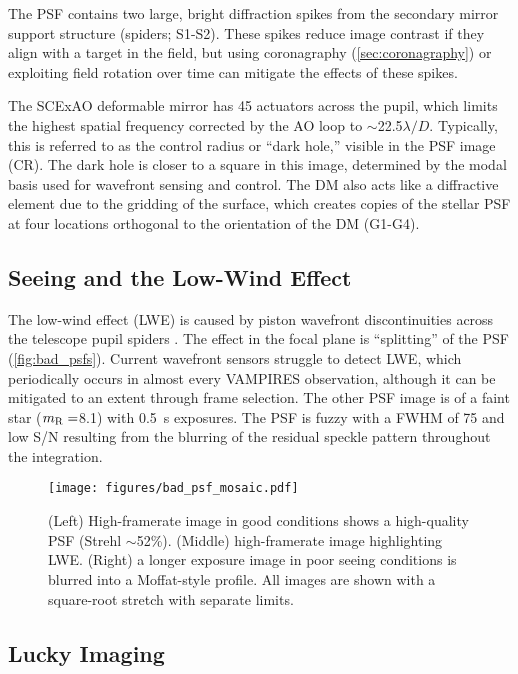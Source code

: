 The PSF contains two large, bright diffraction spikes from the secondary mirror support structure (spiders; S1-S2). These spikes reduce image contrast if they align with a target in the field, but using coronagraphy (\autoref{sec:coronagraphy}) or exploiting field rotation over time can mitigate the effects of these spikes.

The SCExAO deformable mirror has 45 actuators across the pupil, which limits the highest spatial frequency corrected by the AO loop to $\sim$22.5$\lambda/D$. Typically, this is referred to as the control radius or ``dark hole,'' visible in the PSF image (CR). The dark hole is closer to a square in this image, determined by the modal basis used for wavefront sensing and control. The DM also acts like a diffractive element due to the gridding of the surface, which creates copies of the stellar PSF at four locations orthogonal to the orientation of the DM (G1-G4).

\subsection{Seeing and the Low-Wind Effect}
The low-wind effect (LWE) is caused by piston wavefront discontinuities across the telescope pupil spiders  \citep{milli_low_2018}. The effect in the focal plane is ``splitting'' of the PSF (\autoref{fig:bad_psfs}). Current wavefront sensors struggle to detect LWE, which periodically occurs in almost every VAMPIRES observation, although it can be mitigated to an extent through frame selection. The other PSF image is of a faint star ($m_{\rm R}=$8.1) with \SI{0.5}{\second} exposures. The PSF is fuzzy with a FWHM of \SI{75}{\mas} and low S/N resulting from the blurring of the residual speckle pattern throughout the integration.

\begin{figure}
    \centering
    \texttt{[image: figures/bad\_psf\_mosaic.pdf]}
    \caption{(Left) High-framerate image in good conditions shows a high-quality PSF (Strehl $\sim$52\%). (Middle) high-framerate image highlighting LWE. (Right) a longer exposure image in poor seeing conditions is blurred into a Moffat-style profile. All images are shown with a square-root stretch with separate limits.\label{fig:bad_psfs}}
\end{figure}

\subsection{Lucky Imaging}

